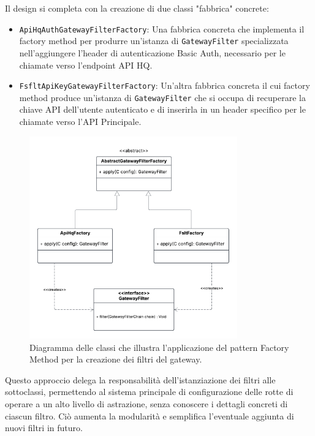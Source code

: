 \documentclass[12pt,a4paper,openright,twoside]{book}
\begin{document}
Il design si completa con la creazione di due classi "fabbrica" concrete:
\begin{itemize}
    \item \texttt{ApiHqAuthGatewayFilterFactory}: Una fabbrica concreta che implementa il factory method per produrre un'istanza di \texttt{GatewayFilter} specializzata nell'aggiungere l'header di autenticazione Basic Auth, necessario per le chiamate verso l'endpoint API HQ.
    \item \texttt{FsfltApiKeyGatewayFilterFactory}: Un'altra fabbrica concreta il cui factory method produce un'istanza di \texttt{GatewayFilter} che si occupa di recuperare la chiave API dell'utente autenticato e di inserirla in un header specifico per le chiamate verso l'API Principale.
\end{itemize}


\begin{figure}[H]
    \centering
    \includegraphics[width=0.8\textwidth]{figures/gwfactory.pdf}
    \caption{Diagramma delle classi che illustra l'applicazione del pattern Factory Method per la creazione dei filtri del gateway.}
    \label{fig:factory_method_uml}
\end{figure}

Questo approccio delega la responsabilità dell'istanziazione dei filtri alle sottoclassi, permettendo al sistema principale di configurazione delle rotte di operare a un alto livello di astrazione, senza conoscere i dettagli concreti di ciascun filtro. Ciò aumenta la modularità e semplifica l'eventuale aggiunta di nuovi filtri in futuro.
\end{document}
